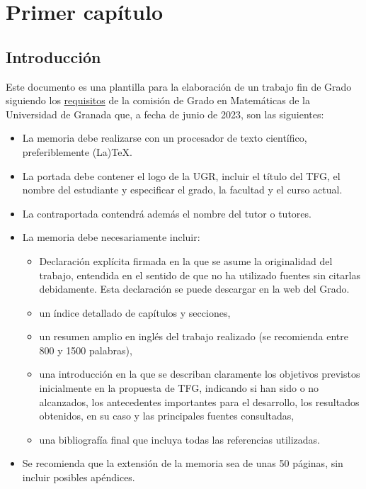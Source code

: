 
\chapter{Primer capítulo}\label{ch:primer-capitulo}

\section{Introducción}
Este documento es una plantilla para la elaboración de un trabajo fin de Grado siguiendo los \href{https://grados.ugr.es/matematicas/pages/infoacademica/tfg/requisitosTFG}{requisitos} de la comisión de Grado en Matemáticas de la Universidad de Granada que, a fecha de junio de 2023, son las siguientes:

\begin{itemize}
  \item La  memoria  debe  realizarse  con  un  procesador  de  texto  científico,  preferiblemente (La)TeX.
  \item La portada  debe contener  el  logo  de  la UGR,  incluir  el  título del TFG, el nombre del estudiante y especificar el grado, la facultad y el curso actual.
  \item La contraportada contendrá además el nombre del tutor o tutores.
  \item La memoria debe necesariamente incluir:
    \begin{itemize}
      \item Declaración explícita firmada en la que se asume la originalidad del trabajo, entendida en el sentido de que no ha utilizado fuentes sin citarlas debidamente. Esta declaración se puede descargar en la web del Grado.
      \item un índice detallado de capítulos y secciones,
      \item un resumen amplio en inglés del trabajo realizado (se recomienda entre 800 y 1500 palabras),
      \item una introducción en la que se describan claramente los objetivos previstos inicialmente en la propuesta de TFG, indicando si han sido o no alcanzados, los antecedentes importantes para el desarrollo, los resultados obtenidos, en su caso y las principales fuentes consultadas,
      \item una bibliografía final que incluya todas las referencias utilizadas.
    \end{itemize}
  \item Se recomienda que la extensión de la memoria sea de unas 50 páginas, sin incluir posibles apéndices.
\end{itemize}

